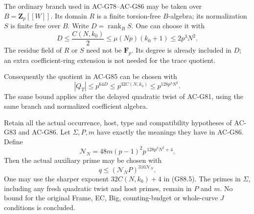 \begin{theorem}
\label{thm:G88}
The ordinary branch used in AC-G78--AC-G86 may be taken over
\(B=\mathbf Z_p[[W]]\). Its domain \(R\) is a finite torsion-free
\(B\)-algebra; its normalization \(S\) is finite free over \(B\).
Write \(D=\operatorname{rank}_B S\). One can choose it with
\[
 D\leq \frac{C(N,k_0)}2
 \leq \mu(Np)(k_0+1)
 \leq 2p^3N^2.
 \tag{G88.3}
\]
The residue field of \(R\) or \(S\) need not be \(\mathbf F_p\).
Its degree is already included in \(D\); an extra coefficient-ring
extension is not needed for the trace quotient.

Consequently the quotient in AC-G85 can be chosen with
\[
 |Q_T|\leq p^{64D}\leq p^{32C(N,k_0)}
 \leq p^{128p^3N^2}.
 \tag{G88.4}
\]
The same bound applies after the delayed quadratic twist of AC-G81,
using the same branch and normalized coefficient algebra.

Retain all the actual occurrence, host, type and compatibility
hypotheses of AC-G83 and AC-G86. Let \(\Sigma,P,m\) have exactly
the meanings they have in AC-G86. Define
\[
 \mathcal N_N
   =48m(p-1)^2p^{\,128p^3N^2+4}.
 \tag{G88.5}
\]
Then the actual auxiliary prime may be chosen with
\[
 q\leq(\mathcal N_NP)^{310\mathcal N_N}.
 \tag{G88.6}
\]
One may use the sharper exponent \(32C(N,k_0)+4\) in (G88.5).
The primes in \(\Sigma\), including any fresh quadratic twist and
host primes, remain in \(P\) and \(m\). No bound for the original
Frame, EC, Big, counting-budget or whole-curve \(J\) conditions is
concluded.
\end{theorem}

